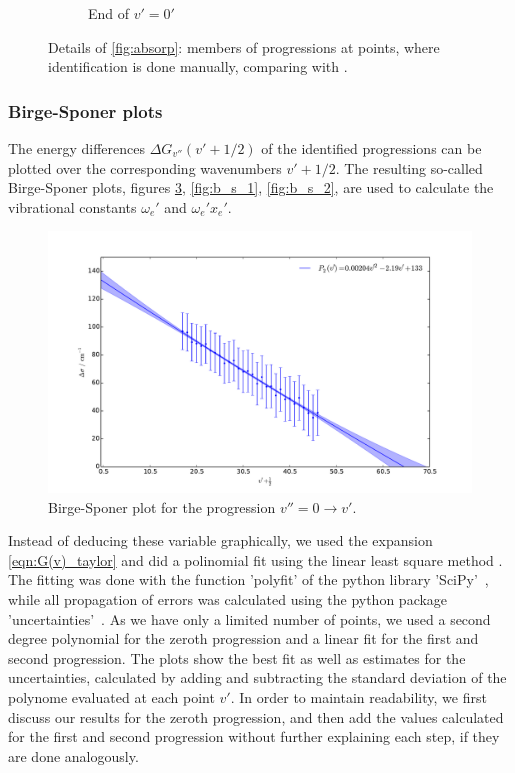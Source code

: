 \begin{figure}
\begin{subfigure}[b]{\mpltw}
        \caption{End of $v'=0'$}
        \label{fig:absorp_detail_03}
    \end{subfigure}
    \caption{Details of \ref{fig:absorp}: members of progressions at points, where 
    identification is done manually, comparing with \cite{staatsexamen}.
    }
    \label{fig:absorp_detail}
\end{figure}



\FloatBarrier

\subsubsection{Birge-Sponer plots}
The energy differences $\Delta G_{v''}(v' + 1/2)$ of the identified progressions can 
be plotted over the corresponding wavenumbers $v' + 1/2$. The resulting so-called 
Birge-Sponer plots, figures 
\ref{fig:b_s_0},  \ref{fig:b_s_1},  \ref{fig:b_s_2}, 
are used to calculate the vibrational constants $\omega_e'$ and $\omega_e' x_e'$. 

\begin{figure}
    \centering
    \includegraphics[width=\pltw]{analysis/figures/b_s_0.pdf}
    \caption{Birge-Sponer plot for the progression $v'' = 0 \rightarrow v'$.  
    }
    \label{fig:b_s_0}
\end{figure}

Instead of deducing these variable graphically, we used the expansion 
\eqref{eqn:G(v)_taylor} and did a 
polinomial fit using the linear least square method \cite{cowan1998statistical}. 
The fitting was done with the function 'polyfit' of the python library 'SciPy'~\cite{scipy}, 
while all propagation of errors was calculated using the python package 
'uncertainties'~\cite{uc}.
As we have only a limited number of points, we used a second degree polynomial
for the zeroth progression and a linear fit for the first and second progression. 
The plots show the best fit as well as estimates for the uncertainties, 
calculated by adding and subtracting the standard deviation of the 
polynome evaluated at each point $v'$. 
In order to maintain readability, we first discuss our results for the zeroth 
progression, and then add the values calculated for the first and second progression 
without further explaining each step, if they are done analogously.

